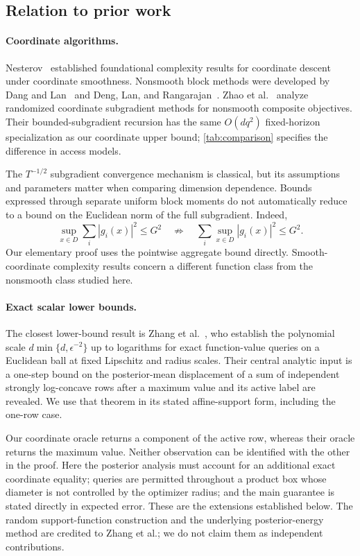 \documentclass[11pt]{article}
\numberwithin{equation}{section}
\theoremstyle{definition}
\theoremstyle{remark}
\newcommand{\eps}{\epsilon}
\begin{document}
\subsection{Relation to prior work}\label{sec:related}

\paragraph{Coordinate algorithms.}
Nesterov\ \cite{Nesterov2012} established foundational complexity results for coordinate descent under coordinate smoothness. Nonsmooth block methods were developed by Dang and Lan\ \cite{DangLan2015} and Deng, Lan, and Rangarajan\ \cite{DengLanRangarajan2015}. Zhao et al.\ \cite{ZhaoEtAl2023} analyze randomized coordinate subgradient methods for nonsmooth composite objectives. Their bounded-subgradient recursion has the same $O(dq^2)$ fixed-horizon specialization as our coordinate upper bound; \cref{tab:comparison} specifies the difference in access models.

The $T^{-1/2}$ subgradient convergence mechanism is classical, but its assumptions and parameters matter when comparing dimension dependence. Bounds expressed through separate uniform block moments do not automatically reduce to a bound on the Euclidean norm of the full subgradient. Indeed,
\[
\sup_{x\in D}\sum_i|g_i(x)|^2\le G^2
\quad\not\Rightarrow\quad
\sum_i\sup_{x\in D}|g_i(x)|^2\le G^2.
\]
Our elementary proof uses the pointwise aggregate bound directly. Smooth-coordinate complexity results concern a different function class from the nonsmooth class studied here.

\paragraph{Exact scalar lower bounds.}
The closest lower-bound result is Zhang et al.\ \cite{ZZQL2026}, who establish the polynomial scale $d\min\{d,\eps^{-2}\}$ up to logarithms for exact function-value queries on a Euclidean ball at fixed Lipschitz and radius scales. Their central analytic input is a one-step bound on the posterior-mean displacement of a sum of independent strongly log-concave rows after a maximum value and its active label are revealed. We use that theorem in its stated affine-support form, including the one-row case.

Our coordinate oracle returns a component of the active row, whereas their oracle returns the maximum value. Neither observation can be identified with the other in the proof. Here the posterior analysis must account for an additional exact coordinate equality; queries are permitted throughout a product box whose diameter is not controlled by the optimizer radius; and the main guarantee is stated directly in expected error. These are the extensions established below. The random support-function construction and the underlying posterior-energy method are credited to Zhang et al.; we do not claim them as independent contributions.
\end{document}
